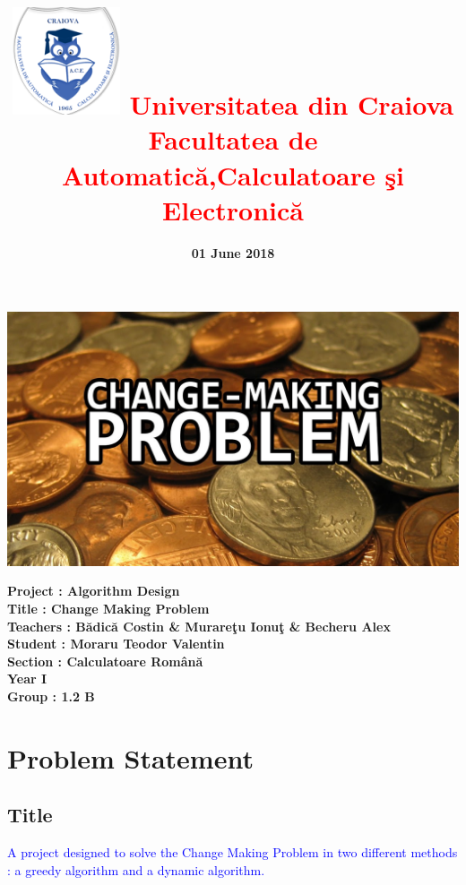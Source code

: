 \documentclass[12]{article}
\begin{document}
\title{\textbf{\includegraphics[scale=0.5]{42.png}
\textcolor{red}{Universitatea din Craiova \\Facultatea de Automatic\u{a},Calculatoare \c{s}i Electronic\u{a}}}}
\date{\textbf{01 June 2018}}
\maketitle
\begin{center}
\includegraphics[scale=0.3]{cmp.jpg}
\end{center}
\textbf{Project : Algorithm Design} \\
\textbf{Title : Change Making Problem}\\
\textbf{Teachers : B\u{a}dic\u{a} Costin \& Murare\c{t}u Ionu\c{t} \& Becheru Alex} \\
\textbf{Student : Moraru Teodor Valentin} \\
\textbf{Section : Calculatoare Rom\^{a}n\u{a}\\ Year I\\ Group : 1.2 B}
\newpage
\tableofcontents

\newpage
\section{Problem Statement}

\textcolor{white}{}
\subsection{Title}
\textcolor{blue}  {A project designed to solve the Change Making Problem in two different methods : a greedy algorithm and a dynamic algorithm.}
\end{document}
